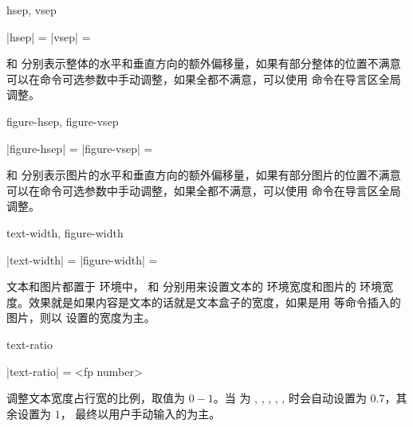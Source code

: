 \documentclass{l3doc}
\begin{document}
\begin{function}[added = 2022-01-22, updated = 2022-01-23]{hsep, vsep}
  \begin{syntax}
    |hsep| =  \init{0pt}
    |vsep| =  \init{0pt}
  \end{syntax}
   和  分别表示整体的水平和垂直方向的额外偏移量，如果有部分整体的位置不满意可以在命令可选参数中手动调整，如果全都不满意，可以使用  命令在导言区全局调整。
\end{function}

\begin{function}[added = 2022-01-23]{figure-hsep, figure-vsep}
  \begin{syntax}
    |figure-hsep| =  \init{0pt}
    |figure-vsep| =  \init{0pt}
  \end{syntax}
   和  分别表示图片的水平和垂直方向的额外偏移量，如果有部分图片的位置不满意可以在命令可选参数中手动调整，如果全都不满意，可以使用  命令在导言区全局调整。
\end{function}


\begin{function}[added = 2022-01-22]{text-width, figure-width}
  \begin{syntax}
    |text-width| =  \init{\hsize}
    |figure-width| =  \init{\hsize}
  \end{syntax}
  文本和图片都置于  环境中， 和  分别用来设置文本的  环境宽度和图片的  环境宽度。效果就是如果内容是文本的话就是文本盒子的宽度，如果是用  等命令插入的图片，则以  设置的宽度为主。
\end{function}


\begin{function}[added = 2022-01-22, updated = 2022-01-26]{text-ratio}
  \begin{syntax}
    |text-ratio| = <fp number>
  \end{syntax}
  调整文本宽度占行宽的比例，取值为 $0-1$。当  为 , , , , ,  时会自动设置为 $0.7$，其余设置为 $1$， 最终以用户手动输入的为主。
\end{function}
\end{document}
